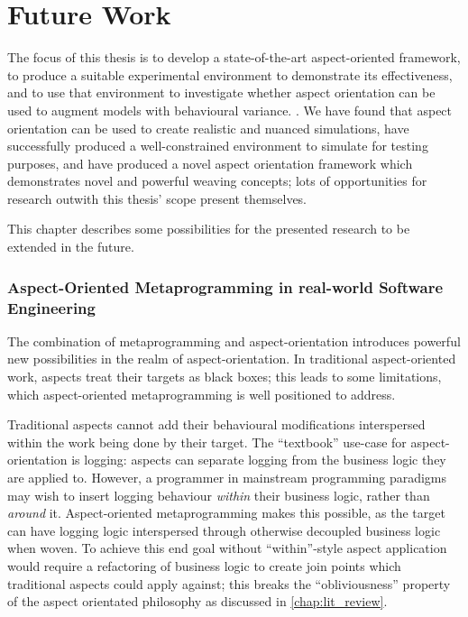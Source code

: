 \chapter{Future Work}\label{chap:future_work}

The focus of this thesis is to develop a state-of-the-art aspect-oriented
framework, to produce a suitable experimental environment to demonstrate its
effectiveness, and to use that environment to investigate whether aspect
orientation can be used to augment models with behavioural variance. . We
have found that aspect orientation can be used to create realistic and nuanced
simulations, have successfully produced a well-constrained environment to
simulate for testing purposes, and have produced a novel aspect orientation
framework which demonstrates novel and powerful weaving concepts; lots of
opportunities for research outwith this thesis' scope present themselves.

This chapter describes some possibilities for the presented research to be
extended in the future.


\subsection{Aspect-Oriented Metaprogramming in real-world Software Engineering}
\label{subsec:aspect_oriented_metaprogramming}

The combination of metaprogramming and aspect-orientation introduces powerful
new possibilities in the realm of aspect-orientation. In traditional
aspect-oriented work, aspects treat their targets as black boxes; this leads to
some limitations, which aspect-oriented metaprogramming is well positioned to address.

Traditional aspects cannot add their behavioural modifications interspersed
within the work being done by their target. The ``textbook'' use-case for
aspect-orientation is logging: aspects can separate logging from the business
logic they are applied to. However, a programmer in mainstream programming
paradigms may wish to insert logging behaviour \emph{within} their business
logic, rather than \emph{around} it. Aspect-oriented metaprogramming makes this
possible, as the target can have logging logic interspersed through otherwise
decoupled business logic when woven. To achieve this end goal without
``within''-style aspect application would require a refactoring of business
logic to create join points which traditional aspects could apply against; this
breaks the ``obliviousness'' property of the aspect orientated philosophy as
discussed in \cref{chap:lit_review}.


